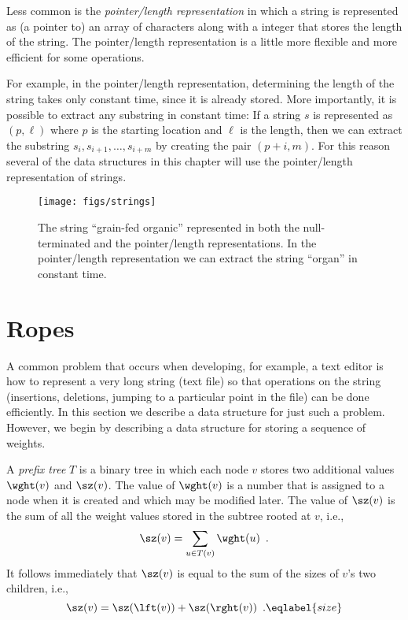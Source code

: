 Less common is the \emph{pointer/length representation} in which a
string is represented as (a pointer to) an array of characters along
with a integer that stores the length of the string.  The pointer/length
representation is a little more flexible and more efficient for some
operations.

For example, in the pointer/length representation, determining the length
of the string takes only constant time, since it is already stored.
More importantly, it is possible to extract any substring in constant
time: If a string $s$ is represented as $(p,\ell)$ where $p$ is the
starting location and $\ell$ is the length, then we can extract the
substring $s_i,s_{i+1},\ldots,s_{i+m}$ by creating the pair $(p+i,m)$. For
this reason several of the data structures in this chapter will use the
pointer/length representation of strings.

\begin{figure}
  \begin{center}
    \texttt{[image: figs/strings]}
  \end{center}
  \caption{The string ``grain-fed organic'' represented in both the null-terminated and the pointer/length representations.  In the pointer/length representation we can extract the string ``organ'' in constant time.}
\end{figure}

\section{Ropes}

A common problem that occurs when developing, for example, a text
editor is how to represent a very long string (text file) so that
operations on the string (insertions, deletions, jumping to a
particular point in the file) can be done efficiently.  In this
section we describe a data structure for just such a problem.
However, we begin by describing a data structure for storing a
sequence of weights.

A \emph{prefix tree} $T$ is a binary tree in which each node $v$
stores two additional values $\wght(v)$ and $\sz(v)$. The value of
$\wght(v)$ is a number that is assigned to a node when it is created
and which may be modified later.  The value of $\sz(v)$ is the sum of
all the weight values stored in the subtree rooted at $v$, i.e.,
\[
   \sz(v) = \sum_{u\in T(v)} \wght(u) \enspace .
\]
It follows immediately that $\sz(v)$ is equal to the sum of the sizes
of $v$'s two children, i.e.,
\begin{equation}
   \sz(v) = \sz(\lft(v)) + \sz(\rght(v)) \enspace . \eqlabel{size}
\end{equation}

